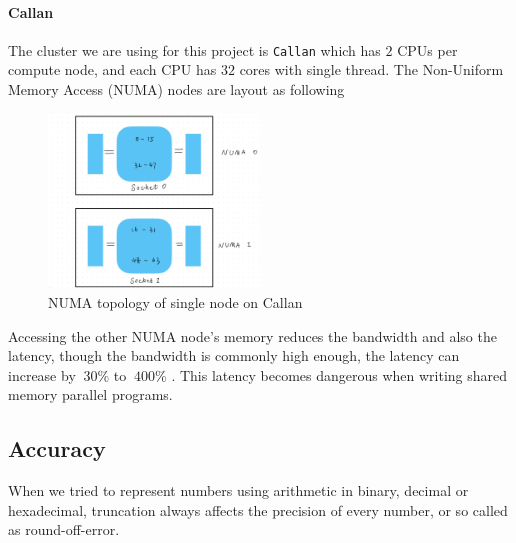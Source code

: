 \paragraph{Callan}
The cluster we are using for this project is \texttt{Callan} \cite{Callan_TCD} which has 
$2$ CPUs per compute node, and each CPU has $32$ cores with single thread. 
The Non-Uniform Memory Access (NUMA) nodes are layout as following 
\begin{figure}[htbp]
  \centering
  \includegraphics[width=0.5\textwidth]{figure/FIG_Topology_Callan.jpg}
  \caption{NUMA topology of single node on Callan}
  \label{FIG_Topology_Callan}
\end{figure}
Accessing the other NUMA node's memory reduces the bandwidth and also the latency,
though the bandwidth is commonly high enough, the latency can increase by 
$~30\%$ to $~400\%$ \cite{NUMA_Latency_TCD}. 
This latency becomes dangerous when writing shared memory parallel programs.


\subsection{Accuracy}
When we tried to represent numbers using arithmetic in binary, decimal or hexadecimal, truncation always affects the precision of every number, 
or so called as 
round-off-error.

